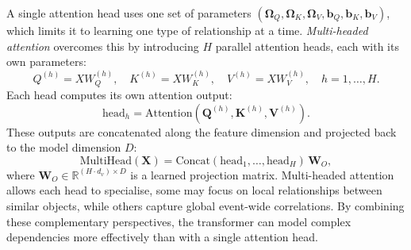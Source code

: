 A single attention head uses one set of parameters $(\mathbf{\Omega}_Q, \mathbf{\Omega}_K, \mathbf{\Omega}_V, \mathbf{b}_Q, \mathbf{b}_K, \mathbf{b}_V)$, which limits it to learning one type of relationship at a time. \emph{Multi-headed attention} overcomes this by introducing $H$ parallel attention heads, each with its own parameters:
\begin{equation}
Q^{(h)} = X W_Q^{(h)}, \quad
K^{(h)} = X W_K^{(h)}, \quad
V^{(h)} = X W_V^{(h)}, \quad h = 1, \dots, H.
\end{equation}
Each head computes its own attention output:
\begin{equation}
\mathrm{head}_h = \mathrm{Attention}\left( \mathbf{Q}^{(h)}, \mathbf{K}^{(h)}, \mathbf{V}^{(h)} \right).
\end{equation}
These outputs are concatenated along the feature dimension and projected back to the model dimension $D$:
\begin{equation}
\mathrm{MultiHead}(\mathbf{X}) = \mathrm{Concat}\left(\mathrm{head}_1, \dots, \mathrm{head}_H\right) \, \mathbf{W}_O,
\end{equation}
where $\mathbf{W}_O \in \mathbb{R}^{(H \cdot d_v) \times D}$ is a learned projection matrix. Multi-headed attention allows each head to specialise, some may focus on local relationships between similar objects, while others capture global event-wide correlations. 
By combining these complementary perspectives, the transformer can model complex dependencies more effectively than with a single attention head.
